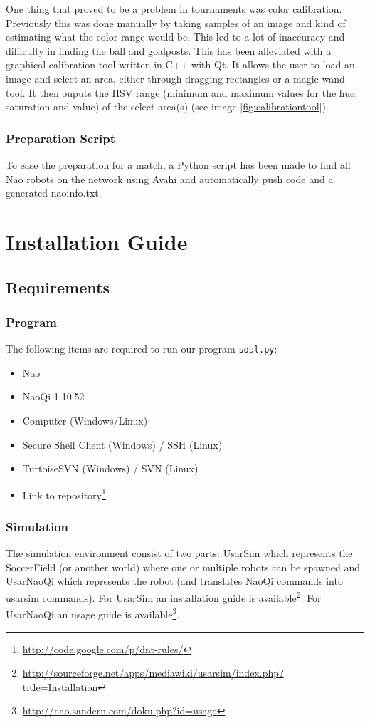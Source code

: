 \documentclass[a4paper]{article}
\begin{document}
One thing that proved to be a problem in tournaments was color calibration.
Previously this was done manually by taking samples of an image and kind of
estimating what the color range would be. This led to a lot of inaccuracy and
difficulty in finding the ball and goalposts. This has been alleviated with a
graphical calibration tool written in C++ with Qt. It allows the user to load an
image and select an area, either through dragging rectangles or a magic wand
tool. It then ouputs the HSV range (minimum and maximum values for the hue,
saturation and value) of the select area(s) (see image
\ref{fig:calibrationtool}).

\subsubsection{Preparation Script}
To ease the preparation for a match, a Python script has been made to find all Nao robots on the network using Avahi and automatically push code and a generated naoinfo.txt. 

\section{Installation Guide}
\subsection{Requirements}
\subsubsection{Program}
The following items are required to run our program \texttt{soul.py}:
\begin{itemize}
\item Nao
\item NaoQi 1.10.52
\item Computer (Windows/Linux)
\item Secure Shell Client (Windows) / SSH (Linux)
\item TurtoiseSVN (Windows) / SVN (Linux)
\item Link to repository\footnote{\url{http://code.google.com/p/dnt-rules/}}
\end{itemize}

\subsubsection{Simulation}
The simulation environment consist of two parts: UsarSim which represents the SoccerField (or another world) where one or multiple robots can be spawned and UsarNaoQi which represents the robot (and translates NaoQi commands into usarsim commands).
For UsarSim an installation guide is available\footnote{\url{http://sourceforge.net/apps/mediawiki/usarsim/index.php?title=Installation}}. For UsarNaoQi an usage guide is available\footnote{\url{http://nao.sandern.com/doku.php?id=usage}}.
\end{document}
